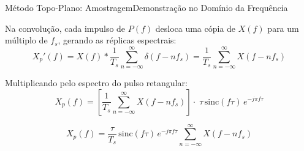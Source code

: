 \begin{frame}{Método Topo-Plano: Amostragem}{Demonstração no Domínio da Frequência}
  \small

  Na convolução, cada impulso de $P(f)$ desloca uma cópia de $X(f)$ para um
  múltiplo de $f_s$, gerando as réplicas espectrais:
  \begin{equation*}
    X_p'(f) = X(f) * \frac{1}{T_s}\sum_{n=-\infty}^{\infty}
      \delta(f - nf_s) = \frac{1}{T_s}\sum_{n=-\infty}^{\infty} X(f - nf_s)
  \end{equation*}

  Multiplicando pelo espectro do pulso retangular:
  \begin{equation*}
    X_p(f) = \left[\frac{1}{T_s}\sum_{n=-\infty}^{\infty}
      X(f - nf_s)\right] \cdot\; \tau\,\mathrm{sinc}(f\tau)\,
      e^{-j\pi f\tau}
  \end{equation*}

  \vspace{-0.2em}
  \begin{equation}
    \boxed{\;
      X_p(f) = \frac{\tau}{T_s}\,
      \mathrm{sinc}(f\tau)\,e^{-j\pi f\tau}
      \sum_{n=-\infty}^{\infty} X(f - nf_s)
    \;}
    \label{eq: sinal_amostrado_flattop_freq}
  \end{equation}

  \vspace{0.2em}


\end{frame}

